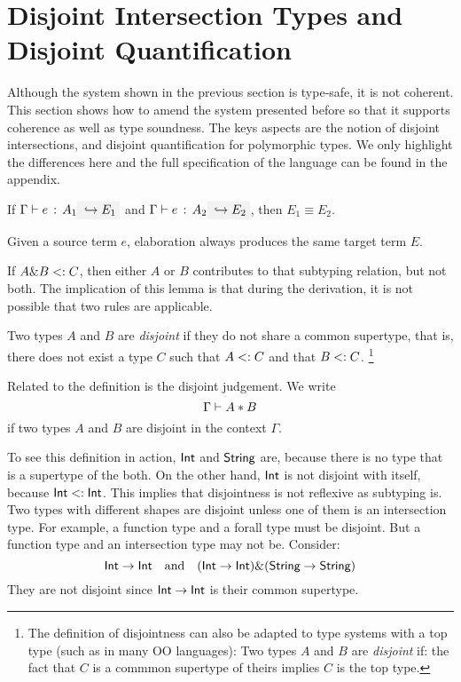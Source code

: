\section{Disjoint Intersection Types and Disjoint Quantification}

Although the system shown in the previous section is type-safe, it is not
coherent. This section shows how to amend the system presented before so that it
supports coherence as well as type soundness. The keys aspects are the notion of
disjoint intersections, and disjoint quantification for polymorphic types. We
only highlight the differences here and the full specification of the language
can be found in the appendix.

\begin{theorem} \label{unique-elaboration}
  If $\hastype \Gamma e {A_1} \yields {E_1}$ and $\hastype \Gamma e {A_2}
  \yields {E_2}$, then $E_1 \equiv E_2$.
\end{theorem}

Given a source term $e$, elaboration always produces the same target term $E$.


If $A \& B <: C$, then either $A$ or $B$ contributes to that subtyping
relation, but not both. The implication of this lemma is that during the
derivation, it is not possible that two rules are applicable.

\begin{definition}
  Two types $A$ and $B$ are \emph{disjoint} if they do not share a common
  supertype, that is, there does not exist a type $C$ such that $A <: C$
  and that $B <: C$. \footnote{
  The definition of disjointness can also be adapted to type systems with a top
  type (such as \lstinline@Object@ in many OO languages): Two types $A$ and $B$
  are \emph{disjoint} if: the fact that $C$ is a commmon supertype of theirs
  implies $C$ is the top type.
  }
\end{definition}

Related to the definition is the disjoint judgement. We write
\[ \Gamma \vdash A * B \]
if two types $A$ and $B$ are disjoint in the context $\Gamma$.

To see this definition in action, $\textsf{Int}$ and $\textsf{String}$ are, because there is
no type that is a supertype of the both. On the other hand, $\textsf{Int}$ is not
disjoint with itself, because $\textsf{Int} <: \textsf{Int}$. This implies that
disjointness is not reflexive as subtyping is. Two types with different shapes
are disjoint unless one of them is an intersection type. For example, a function
type and a forall type must be disjoint. But a function type and an intersection
type may not be. Consider:
\[ \textsf{Int} \to \textsf{Int} \quad \text{and} \quad (\textsf{Int} \to \textsf{Int}) \& (\textsf{String} \to \textsf{String}) \]
They are not disjoint since $\textsf{Int} \to \textsf{Int}$ is their common supertype.

